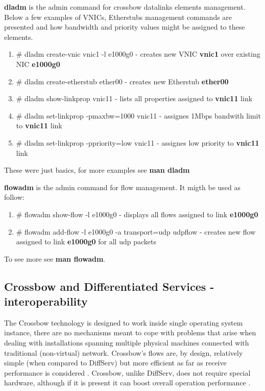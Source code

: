 \documentclass[11pt]{book}
\begin{document}
        \textbf{dladm} is the admin command for crossbow datalinks elements management. Below a few examples of VNICs,
        Etherstubs management commands are presented and how bandwidth and priority values might be assigned to these
        elements.
  
        \begin{enumerate}
          \item \# dladm create-vnic vnic1 -l e1000g0 - creates new VNIC \textbf{vnic1} over existing NIC \textbf{e1000g0}
          \item \# dladm create-etherstub ether00 - creates new Etherstub \textbf{ether00}
          \item \# dladm show-linkprop vnic11 - lists all properties assigned to \textbf{vnic11} link
          \item \# dladm set-linkprop -pmaxbw=1000 vnic11 - assignes 1Mbps bandwith limit to \textbf{vnic11} link
          \item \# dladm set-linkprop -ppriority=low vnic11 - assignes low priority to \textbf{vnic11} link
        \end{enumerate}
  
        These were just basics, for more examples see \textbf{man dladm}

        \medskip

        \textbf{flowadm} is the admin command for flow management. It migth be used as follow:     

        \begin{enumerate}
          \item \# flowadm show-flow -l e1000g0 - displays all flows assigned to link \textbf{e1000g0}
          \item \# flowadm add-flow -l e1000g0 -a transport=udp udpflow - creates new flow assigned to link
                \textbf{e1000g0} for all udp packets
        \end{enumerate}

        To see more see \textbf{man flowadm}.


      \subsection{Crossbow and Differentiated Services - interoperability}
      \label{sub:sol:diffserv}

        The Crossbow technology is designed to work inside single operating system instance, there are no mechanisms
        meant to cope with problems that arise when dealing with installations spanning multiple physical machines
        connected with traditional (non-virtual) network. Crossbow's flows are, by design, relatively simple (when
        compared to DiffServ) but more efficient as far as receive performance is considered \cite{xbow-vertically}.
        Crossbow, unlike DiffServ, does not require special hardware, although if it is present it can boost overall
        operation performance \cite{xbow-vertically}.
\end{document}
